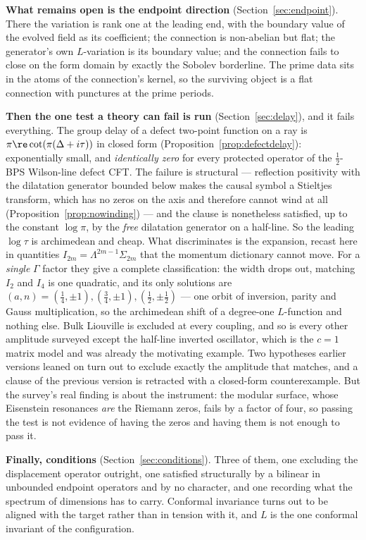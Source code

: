 \textbf{What remains open is the endpoint direction} (Section~\ref{sec:endpoint}).
There the variation is rank one at the leading end, with the boundary value of
the evolved field as its coefficient; the connection is non-abelian but flat; the
generator's own $L$-variation is its boundary value; and the connection fails to
close on the form domain by exactly the Sobolev borderline. The prime data sits
in the atoms of the connection's kernel, so the surviving object is a flat
connection with punctures at the prime periods.

\textbf{Then the one test a theory can fail is run} (Section~\ref{sec:delay}),
and it fails everything. The group delay of a defect two-point function on a ray
is $\pi\re\cot(\pi(\Delta+i\tau))$ in closed form
(Proposition~\ref{prop:defectdelay}): exponentially small, and \emph{identically
zero} for every protected operator of the $\frac12$-BPS Wilson-line defect CFT.
The failure is structural --- reflection positivity with the dilatation generator
bounded below makes the causal symbol a Stieltjes transform, which has no zeros on
the axis and therefore cannot wind at all
(Proposition~\ref{prop:nowinding}) --- and the clause is nonetheless satisfied,
up to the constant $\log\pi$, by the \emph{free} dilatation generator on a
half-line. So the leading $\log\tau$ is archimedean and cheap. What
discriminates is the expansion, recast here in quantities
$I_{2m}=\Lambda^{2m-1}\Sigma_{2m}$ that the momentum dictionary cannot move. For
a \emph{single} $\Gamma$ factor they give a complete classification: the width
drops out, matching $I_2$ and $I_4$ is one quadratic, and its only solutions are
$(a,n)=(\frac14,\pm1),(\frac34,\pm1),(\frac12,\pm\frac12)$ --- one orbit of
inversion, parity and Gauss multiplication, so the archimedean shift of a
degree-one $L$-function and nothing else. Bulk Liouville is excluded at every
coupling, and so is every other amplitude surveyed except the half-line inverted
oscillator, which is the $c=1$ matrix model and was already the motivating
example. Two hypotheses earlier versions leaned on turn out to exclude exactly the
amplitude that matches, and a clause of the previous version is retracted with a
closed-form counterexample. But the survey's real finding is about the instrument:
the modular surface, whose Eisenstein resonances \emph{are} the Riemann zeros,
fails by a factor of four, so passing the test is not evidence of having the zeros
and having them is not enough to pass it.

\textbf{Finally, conditions} (Section~\ref{sec:conditions}). Three of them, one
excluding the displacement operator outright, one satisfied structurally by a
bilinear in unbounded endpoint operators and by no character, and one recording
what the spectrum of dimensions has to carry. Conformal invariance turns out to be
aligned with the target rather than in tension with it, and $L$ is the one
conformal invariant of the configuration.

